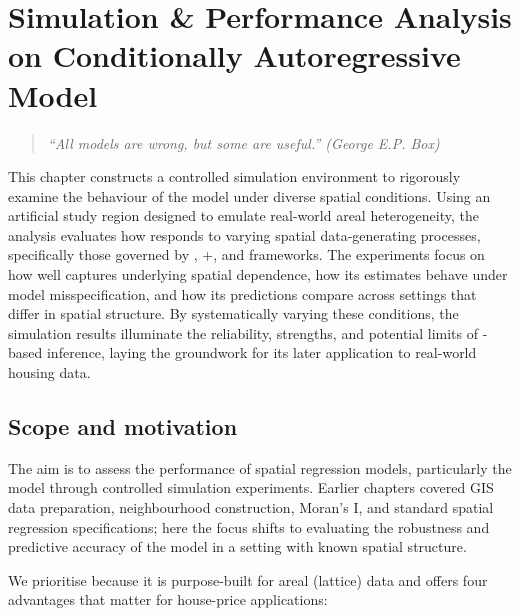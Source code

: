 \documentclass[
  letterpaper,
  DIV=11,
  numbers=noendperiod]{scrartcl}
\author{}
\date{}
\begin{document}
\section{Simulation \& Performance Analysis on Conditionally
Autoregressive
Model}\label{simulation-performance-analysis-on-conditionally-autoregressive-model}

\begin{quote}
\emph{``All models are wrong, but some are useful.'' (George E.P. Box)}
\end{quote}

This chapter constructs a controlled simulation environment to
rigorously examine the behaviour of the  model under diverse
spatial conditions. Using an artificial study region designed to emulate
real-world areal heterogeneity, the analysis evaluates how 
responds to varying spatial data-generating processes, specifically
those governed by , +, and 
frameworks. The experiments focus on how well  captures
underlying spatial dependence, how its estimates behave under model
misspecification, and how its predictions compare across settings that
differ in spatial structure. By systematically varying these conditions,
the simulation results illuminate the reliability, strengths, and
potential limits of -based inference, laying the groundwork for
its later application to real-world housing data.

\subsection{Scope and motivation}\label{scope-and-motivation}

The aim is to assess the performance of spatial regression models,
particularly the  model through controlled simulation
experiments. Earlier chapters covered GIS data preparation,
neighbourhood construction, Moran's I, and standard spatial regression
specifications; here the focus shifts to evaluating the robustness and
predictive accuracy of the  model in a setting with known
spatial structure.

We prioritise  because it is purpose-built for areal (lattice)
data and offers four advantages that matter for house-price
applications:
\end{document}
